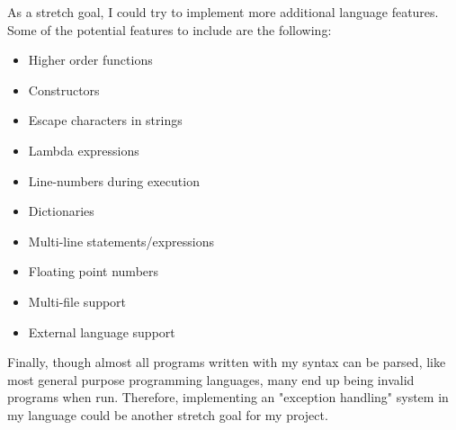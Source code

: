 \documentclass{article}
\begin{document}
As a stretch goal, I could try to implement more additional language features. Some of the potential features to include are the following:
\begin{itemize}
    \item Higher order functions
    \item Constructors
    \item Escape characters in strings
    \item Lambda expressions
    \item Line-numbers during execution
    \item Dictionaries
    \item Multi-line statements/expressions
    \item Floating point numbers
    \item Multi-file support
    \item External language support
\end{itemize}

Finally, though almost all programs written with my syntax can be parsed, like most general purpose programming languages, many end up being invalid programs when run. Therefore, implementing an "exception handling" system in my language could be another stretch goal for my project.
\end{document}
